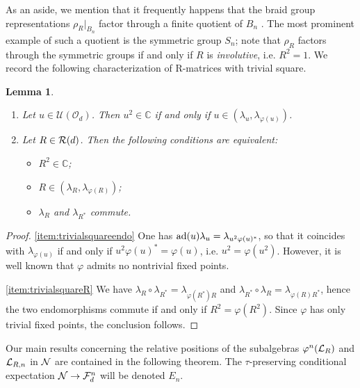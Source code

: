\documentclass[12pt,a4paper]{amsart}
\numberwithin{equation}{section}
\newtheorem{lemma}[theorem]{Lemma}
\theoremstyle{remark}
\newcommand{\Cl}{\mathbb{C}}
\def\C{\mathbb{C}}
\newcommand{\la}{\lambda}
\newcommand{\CO}[0]{\mathcal{O}} \newcommand{\CP}[0]{\mathcal{P}}
\newcommand{\CU}[0]{\mathcal{U}} \newcommand{\CV}[0]{\mathcal{V}}
\begin{document}
\medskip

As an aside, we mention that it frequently happens that the braid group representations ${\rho_R}|_{B_n}$ factor through a finite quotient of $B_n$ \cite{GalindoRowell:2013}. The most prominent example of such a quotient is the symmetric group $S_n$; note that $\rho_R$ factors through the symmetric groups if and only if $R$ is {\em involutive}, i.e. $R^2=1$. We record the following characterization of R-matrices with trivial square.

\begin{lemma}\leavevmode
	\begin{enumerate}
        \item\label{item:trivialsquareendo} Let $u\in\CU(\CO_d)$. Then $u^2\in\C$ if and only if $u \in (\lambda_u,\lambda_{\varphi(u)})$.
        \item\label{item:trivialsquareR} 
        Let $R \in \mathcal{R}(d)$. Then the following conditions are equivalent:
        \begin{itemize}
            \item $R^2 \in\Cl$;
            \item $R \in (\lambda_R,\lambda_{\varphi(R)})$;
            \item $\lambda_R$ and $\lambda_{R^*}$ commute.
        \end{itemize}
	 \end{enumerate}
\end{lemma}
\begin{proof}
	\ref{item:trivialsquareendo} One has ${\rm ad}(u) \lambda_u = \lambda_{u^2 \varphi(u)^*}$, so that it coincides with $\lambda_{\varphi(u)}$ if and only if $u^2 \varphi(u)^* = \varphi(u)$,
	i.e. $u^2 = \varphi(u^2)$. However, it is well known that $\varphi$ admits no nontrivial fixed points.
	
	\ref{item:trivialsquareR} We have $\la_R\circ\la_{R^*}=\la_{\varphi(R^*)R}$ and $\la_{R^*}\circ\la_{R}=\la_{\varphi(R)R^*}$, hence the two endomorphisms commute if and only if $R^2=\varphi(R^2)$. Since $\varphi$ has only trivial fixed points, the conclusion follows.
\end{proof}

Our main results concerning the relative positions of the subalgebras $\varphi^n(\mathcal{L}_R)$ and $\mathcal{L}_{R,n}$ in $\mathcal{N}$ are contained in the following theorem. The $\tau$-preserving conditional expectation $\mathcal{N}\to\mathcal{F}_d^n$ will be denoted $E_n$.
\end{document}
